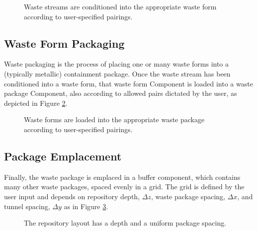 \begin{figure}[htbp!]
\begin{center}
\def\svgwidth{.5\textwidth}

\end{center}
\caption{Waste streams are conditioned into the appropriate waste form 
according to user-specified pairings.}
\label{fig:ws_conditioning}
\end{figure}

\subsection{Waste Form Packaging}

Waste packaging is the process of placing one or many waste forms into a 
(typically metallic) containment package. Once the waste stream has been 
conditioned into a waste form, that waste form Component is loaded into a waste 
package Component, also according to allowed pairs dictated by the user, as 
depicted in Figure \ref{fig:wf_packaging}.

\begin{figure}[htbp!]
\begin{center}
\def\svgwidth{.5\textwidth}

\end{center}
\caption{Waste forms are loaded into the appropriate waste package 
according to user-specified pairings.}
\label{fig:wf_packaging}
\end{figure}


\subsection{Package Emplacement}

Finally, the waste package is emplaced in a buffer component, which 
contains many other waste packages, spaced evenly in a grid. The grid is 
defined by the user input and depends on repository depth, $\Delta z$, waste 
package spacing, $\Delta x$, and tunnel spacing, $\Delta y$ as in Figure 
\ref{fig:repo_layout}.

\begin{figure}[htbp!]
\begin{center}
\def\svgwidth{.5\textwidth}

\end{center}
\caption{The repository layout has a depth and a uniform package spacing.}
\label{fig:repo_layout}
\end{figure}

